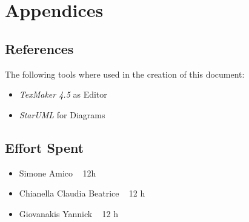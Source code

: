 \documentclass[12pt]{article}
\begin{document}
			
	\section{Appendices}
		\subsection{References}
		The following tools where used in the creation of this document:
		\begin{itemize}
		\item \emph{TexMaker 4.5} as Editor
		\item \emph{StarUML} for Diagrams 
		\end{itemize}
		
		
		\subsection{Effort Spent}
		\begin{itemize}
		\item Simone Amico ~  12h
		\item Chianella Claudia Beatrice ~ 12 h
		\item Giovanakis Yannick ~ 12 h
		\end{itemize}

	 
	
\end{document}
